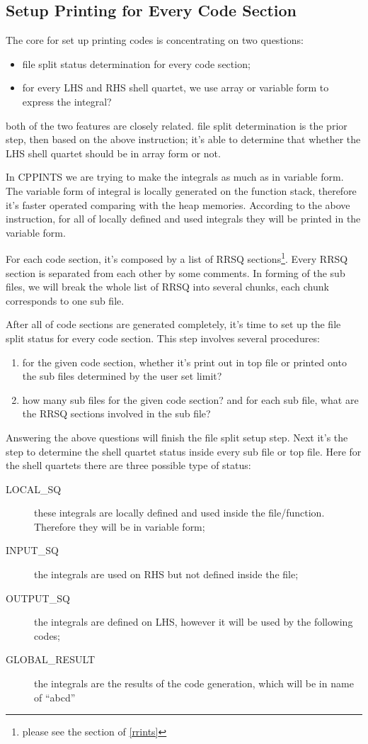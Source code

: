 \subsection{Setup Printing for Every Code Section}
\label{code_generation_print}

The core for set up printing codes is concentrating on two questions:
\begin{itemize}
 \item file split status determination for every code section;
 \item for every LHS and RHS shell quartet, we use array or variable
 form to express the integral?
\end{itemize}
both of the two features are closely related. file split determination
is the prior step, then based on the above instruction; it's able to 
determine that whether the LHS shell quartet should be in array form 
or not.

In CPPINTS we are trying to make the integrals as much as in variable form.
The variable form of integral is locally generated on
the function stack, therefore it's faster operated comparing with the heap memories.
According to the above instruction, for all of locally defined and used integrals 
they will be printed in the variable form.

For each code section, it's composed by a list of RRSQ sections\footnote{please
see the section of \ref{rrints}}. Every RRSQ section is separated from 
each other by some comments. In forming of the sub files, we will break
the whole list of RRSQ into several chunks, each chunk corresponds to 
one sub file.

After all of code sections are generated completely, it's time to set up the 
file split status for every code section. This step involves several procedures:
\begin{enumerate}
  \item for the given code section, whether it's print out in top file or printed 
 onto the sub files determined by the user set limit?
 \item how many sub files for the given code section? and for each sub file,
 what are the RRSQ sections involved in the sub file?
\end{enumerate}

Answering the above questions will finish the file split setup step. Next it's the step
to determine the shell quartet status inside every sub file or top file. Here for the 
shell quartets there are three possible type of status:
\begin{description}
 \item [LOCAL\_SQ] these integrals are locally defined and used inside the file/function.
 Therefore they will be in variable form;
 \item [INPUT\_SQ] the integrals are used on RHS but not defined inside the file;
 \item [OUTPUT\_SQ] the integrals are defined on LHS, however it will be used by the following codes;
 \item [GLOBAL\_RESULT] the integrals are the results of the code generation, which will be 
 in name of ``abcd''
\end{description}

